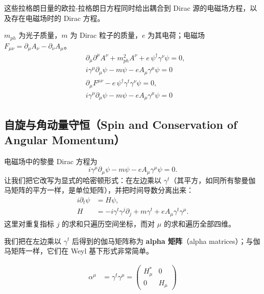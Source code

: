这些拉格朗日量的欧拉-拉格朗日方程同时给出耦合到 Dirac 源的电磁场方程，以及存在电磁场时的 Dirac 方程。

\begin{keybox}[量子电动力学的场方程]
$m_{ph}$ 为光子质量，$m$ 为 Dirac 粒子的质量，$e$ 为其电荷；电磁场 $F_{\mu\nu}=\partial_{\mu}A_{\nu}-\partial_{\nu}A_{\mu}$。
\begin{align}
&\partial_{\mu}\partial^{\mu}A^{\nu}+m_{ph}^{2}A^{\nu}+e\,\psi^{\dagger}\gamma^{\nu}\psi=0, \nonumber\\
&i\gamma^{\mu}\partial_{\mu}\psi-m\psi-eA_{\mu}\gamma^{\mu}\psi=0 \tag{Riemannian}\\[4pt]
&\partial_{\mu}F^{\mu\nu}-e\,\psi^{\dagger}\gamma^{t}\gamma^{\nu}\psi=0, \nonumber\\
&i\gamma^{\mu}\partial_{\mu}\psi-m\psi-eA_{\mu}\gamma^{\mu}\psi=0 \tag{Lorentzian}
\end{align}
\end{keybox}

\subsection{自旋与角动量守恒（Spin and Conservation of Angular Momentum）}

电磁场中的黎曼 Dirac 方程为
\begin{equation}
i\gamma^{\mu}\partial_{\mu}\psi-m\psi-eA_{\mu}\gamma^{\mu}\psi=0.
\end{equation}
让我们把它改写为显式的哈密顿形式：在左边乘以 $\gamma^{t}$（其平方，如同所有黎曼伽马矩阵的平方一样，是单位矩阵），并把时间导数分离出来：
\begin{align}
i\partial_{t}\psi &= H\psi,\\
H &= -i\gamma^{t}\gamma^{j}\partial_{j}+m\gamma^{t}+eA_{\mu}\gamma^{t}\gamma^{\mu}.
\end{align}
这里对重复指标 $j$ 的求和只遍历空间坐标，而对 $\mu$ 的求和遍历全部四维。

我们把在左边乘以 $\gamma^{t}$ 后得到的伽马矩阵称为 \textbf{alpha 矩阵}（alpha matrices）；与伽马矩阵一样，它们在 Weyl 基下形式非常简单。

\begin{keybox}
\begin{align}
\alpha^{\mu} &= \gamma^{t}\gamma^{\mu}
=\begin{pmatrix}H_{\mu}^{*}&0\\ 0&H_{\mu}\end{pmatrix} \tag{Riemannian}
\end{align}
\end{keybox}

